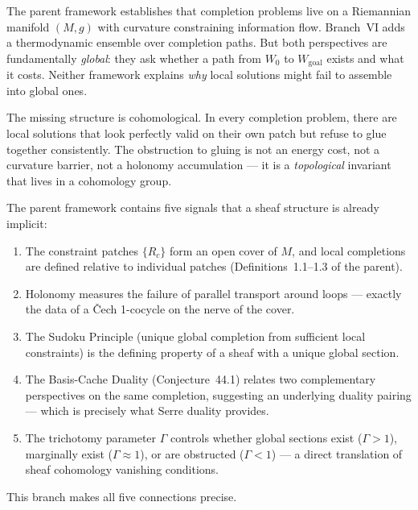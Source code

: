 \documentclass[11pt,letterpaper]{article}
\begin{document}
The parent framework establishes that completion problems live on a 
Riemannian manifold $(M,g)$ with curvature constraining information 
flow. Branch~VI adds a thermodynamic ensemble over completion paths. 
But both perspectives are fundamentally \emph{global}: they ask whether 
a path from $W_0$ to $W_{\mathrm{goal}}$ exists and what it costs. 
Neither framework explains \emph{why} local solutions might fail to 
assemble into global ones.

The missing structure is cohomological. In every completion problem, 
there are local solutions that look perfectly valid on their own patch 
but refuse to glue together consistently. The obstruction to gluing is 
not an energy cost, not a curvature barrier, not a holonomy 
accumulation --- it is a \emph{topological} invariant that lives in a 
cohomology group.

The parent framework contains five signals that a sheaf structure is 
already implicit:

\begin{enumerate}
    \item The constraint patches $\{R_c\}$ form an open cover of $M$, 
    and local completions are defined relative to individual patches 
    (Definitions~1.1--1.3 of the parent).
    
    \item Holonomy measures the failure of parallel transport around 
    loops --- exactly the data of a \v{C}ech 1-cocycle on the nerve 
    of the cover.
    
    \item The Sudoku Principle (unique global completion from sufficient 
    local constraints) is the defining property of a sheaf with a 
    unique global section.
    
    \item The Basis-Cache Duality (Conjecture~44.1) relates two 
    complementary perspectives on the same completion, suggesting an 
    underlying duality pairing --- which is precisely what Serre 
    duality provides.
    
    \item The trichotomy parameter $\Gamma$ controls whether global 
    sections exist ($\Gamma > 1$), marginally exist ($\Gamma \approx 
    1$), or are obstructed ($\Gamma < 1$) --- a direct translation of 
    sheaf cohomology vanishing conditions.
\end{enumerate}

This branch makes all five connections precise.
\end{document}
